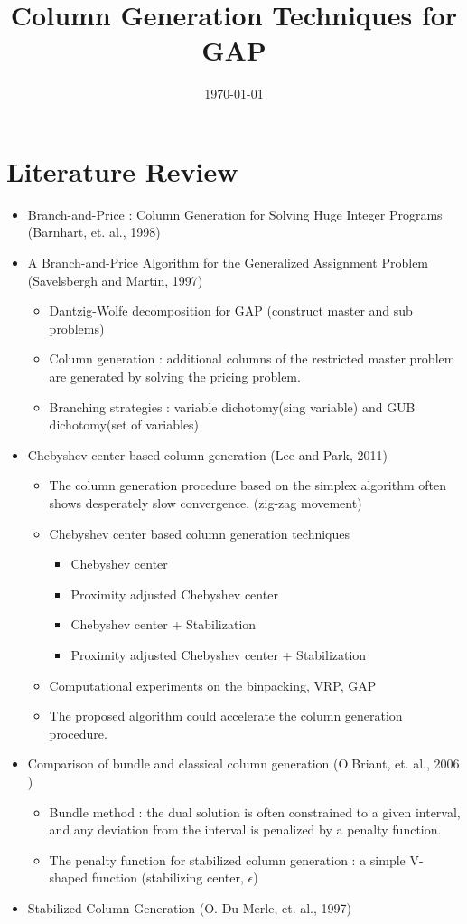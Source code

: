 \documentclass[12pt]{article}
\begin{document}
	\title{Column Generation Techniques for GAP}
	\date{\today}
	\maketitle
	
	\section{Literature Review}
	\begin{itemize}
		\item Branch-and-Price : Column Generation for Solving Huge Integer Programs (Barnhart, et. al., 1998)
		\item A Branch-and-Price Algorithm for the Generalized Assignment Problem (Savelsbergh and Martin, 1997) 
		\begin{itemize}
			\item Dantzig-Wolfe decomposition for GAP (construct master and sub problems)
			\item Column generation : additional columns of the restricted master problem are generated by solving the pricing problem.
			\item Branching strategies : variable dichotomy(sing variable) and GUB dichotomy(set of variables)
		\end{itemize}
		\item Chebyshev center based column generation (Lee and Park, 2011)
		\begin{itemize}
			\item The column generation procedure based on the simplex algorithm often shows desperately slow convergence. (zig-zag movement)
			\item Chebyshev center based column generation techniques
			\begin{itemize}
				\item Chebyshev center 
				\item Proximity adjusted Chebyshev center
				\item Chebyshev center + Stabilization
				\item Proximity adjusted Chebyshev center + Stabilization
			\end{itemize}
			\item Computational experiments on the binpacking, VRP, GAP
			\item The proposed algorithm could accelerate the column generation procedure.
		\end{itemize}
		\item Comparison of bundle and classical column generation (O.Briant, et. al., 2006 )
		\begin{itemize}
			\item Bundle method : the dual solution is often constrained to a given interval, and any deviation from the interval is penalized by a penalty function.
			\item The penalty function for stabilized column generation  : a simple V-shaped function (stabilizing center, $\epsilon$)
		\end{itemize}
		\item Stabilized Column Generation (O. Du Merle, et. al., 1997)
	\end{itemize}
\end{document}
